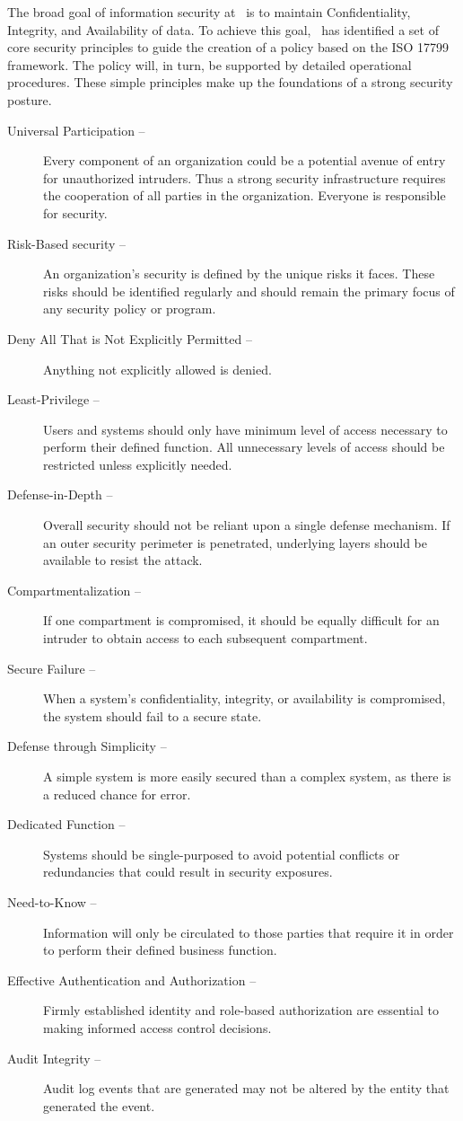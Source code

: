 \documentclass[sec]{policy}
\begin{document}
		The broad goal of information security at \theOrganization\ is to maintain Confidentiality, Integrity, and Availability of data.  To achieve this goal, \theOrganization\ has identified a set of core security principles to guide the creation of a policy based on the ISO 17799 framework.  The policy will, in turn, be supported by detailed operational procedures.  These simple principles make up the foundations of a strong security posture.
		
		\begin{description}
			\item[Universal Participation –] Every component of an organization could be a potential avenue of entry for unauthorized intruders.  Thus a strong security infrastructure requires the cooperation of all parties in the organization.  Everyone is responsible for security.
			\item [Risk-Based security –] An organization’s security is defined by the unique risks it faces.  These risks should be identified regularly and should remain the primary focus of any security policy or program.
			\item [Deny All That is Not Explicitly Permitted –] Anything not explicitly allowed is denied.
			\item [Least-Privilege –] Users and systems should only have minimum level of access necessary to perform their defined function.  All unnecessary levels of access should be restricted unless explicitly needed.
			\item [Defense-in-Depth –] Overall security should not be reliant upon a single defense mechanism.  If an outer security perimeter is penetrated, underlying layers should be available to resist the attack.
			\item [Compartmentalization –] If one compartment is compromised, it should be equally difficult for an intruder to obtain access to each subsequent compartment.
			\item [Secure Failure –] When a system’s confidentiality, integrity, or availability is compromised, the system should fail to a secure state.
			\item [Defense through Simplicity –] A simple system is more easily secured than a complex system, as there is a reduced chance for error.
			\item [Dedicated Function –] Systems should be single-purposed to avoid potential conflicts or redundancies that could result in security exposures.
			\item [Need-to-Know –] Information will only be circulated to those parties that require it in order to perform their defined business function.
			\item [Effective Authentication and Authorization –] Firmly established identity and role-based authorization are essential to making informed access control decisions.
			\item [Audit Integrity –] Audit log events that are generated may not be altered by the entity that generated the event.
		\end{description}
		
\end{document}
